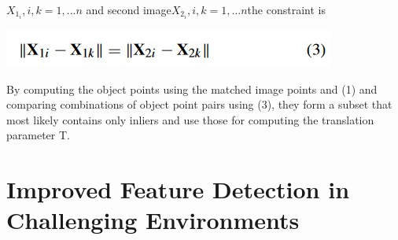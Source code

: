 \begin{math}X_1_i , i, k = 1, . . . n\end{math} and second image\begin{math} X_2_i , i, k = 1, . . . n \end{math}the
constraint is
\begin{center}
   \includegraphics{eq3.jpg}
   \end{center}
By computing the object points using the matched image
points and (1) and comparing combinations of object point
pairs using (3), they form a subset that most likely contains
only inliers and use those for computing the translation
parameter T.\\
\section{Improved Feature Detection in Challenging
Environments}

